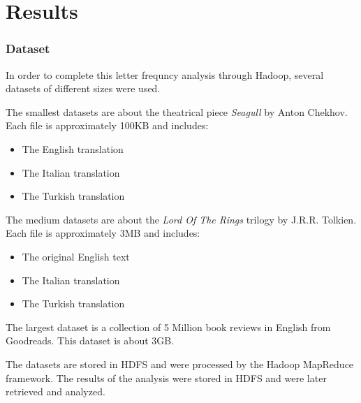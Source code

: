 \chapter{Results}

\subsection{Dataset}
In order to complete this letter frequncy analysis through Hadoop, several datasets of different sizes were used. 

The smallest datasets are about the theatrical piece \textit{Seagull} by Anton Chekhov. Each file is approximately 100KB and includes: 
\begin{itemize}
    \item The English translation
    \item The Italian translation
    \item The Turkish translation
\end{itemize}

The medium datasets are about the \textit{Lord Of The Rings} trilogy by J.R.R. Tolkien. Each file is approximately 3MB and includes: 
\begin{itemize}
    \item The original English text
    \item The Italian translation
    \item The Turkish translation
\end{itemize}

The largest dataset is a collection of 5 Million book reviews in English from Goodreads. This dataset is about 3GB. 
 
The datasets are stored in HDFS and were processed by the Hadoop MapReduce framework. The results of the analysis were stored in HDFS and were later retrieved and analyzed.